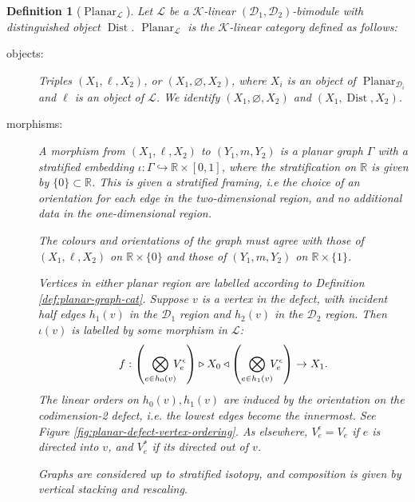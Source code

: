 \documentclass[a4paper]{article}
\numberwithin{equation}{section}
\newtheorem{definition}[counter]{Definition}
\newcommand{\1}{{\mathrm{1}\mkern-4mu{\mathchoice{}{}{\mskip-0.5mu}{\mskip-1mu}}\mathrm{l}}}
\newcommand{\RR}{\mathbb{R}}
\DeclareMathOperator{\Dist}{Dist}
\newcommand{\D}{\mathcal{D}}
\newcommand{\K}{\mathcal{K}}
\renewcommand{\L}{\mathcal{L}}
\DeclareMathOperator{\Planar}{Planar} %
\begin{document}
\begin{definition}[$\Planar_\L$]\label{def:planar-defect-cat}
Let $\L$ be a $\K$-linear $(\D_1,\D_2)$-bimodule with distinguished object $\Dist$.
$\Planar_\L$ is the $\K$-linear category defined as follows:
\begin{description}
  \item[objects:] Triples $( X_1, \ell,X_2)$, or $(X_1,\varnothing,X_2)$, where $X_i$ is an object of $\Planar_{\D_i}$ and $\ell$ is an object of $\L$. We identify $(X_1,\varnothing,X_2)$ and $(X_1,\Dist,X_2)$.
  \item[morphisms:]
    A morphism from $(X_1,\ell,X_2)$ to $(Y_1,m,Y_2)$ is a planar graph $\Gamma$ with a stratified embedding $\iota : \Gamma \hookrightarrow \RR\times[0,1]$, where the stratification on $\RR$ is given by $\{0\} \subset \RR$. This is given a stratified framing, i.e the choice of an orientation for each edge in the two-dimensional region, and no additional data in the one-dimensional region.

    The colours and orientations of the graph must agree with those of $(X_1,\ell,X_2)$ on $\mathbb{R}\times \{0\}$ and those of $(Y_1,m,Y_2)$ on $\mathbb{R}\times \{1\}$. 

    Vertices in either planar region are labelled according to Definition \ref{def:planar-graph-cat}.
    Suppose $v$ is a vertex in the defect, with incident half edges $h_1(v)$ in the $\D_1$ region and $h_2(v)$ in the $\D_2$ region. Then $\iota(v)$ is labelled by some morphism in $\L$:
    \begin{equation}
      f: \left(\bigotimes_{e \in h_0(v)} \hspace{-1ex} V^\epsilon_e \right)\triangleright X_0 \triangleleft \left(\bigotimes_{e \in h_1(v)} \hspace{-1ex}V^\epsilon_e\right) \to X_1.
    \end{equation}
    The linear orders on $h_0(v),h_1(v)$ are induced by the orientation on the codimension-2 defect, i.e. the lowest edges become the innermost. See Figure \ref{fig:planar-defect-vertex-ordering}.
    As elsewhere, $V^\epsilon_e =V_e$ if $e$ is directed into $v$, and $V^*_e$ if its directed out of $v$. 

    Graphs are considered up to stratified isotopy, and composition is given by vertical stacking and rescaling.
\end{description}
\end{definition}
\end{document}
